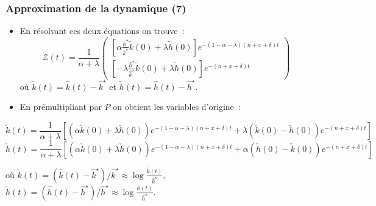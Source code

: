 \documentclass[10pt,notheorems]{beamer}
\theoremstyle{plain}
\theoremstyle{definition} %
\begin{document}
\begin{frame}
  \frametitle{Approximation de la dynamique (7)}

  \begin{itemize}

  \item En résolvant ces deux équations on trouve~:
    \[
      \mathcal Z(t) =
      \frac{1}{\alpha+\lambda}
      \begin{pmatrix}
        \left[\alpha\frac{\hat h^\star}{\hat k^\star}\tilde k(0)+\lambda \tilde h(0)\right]e^{-(1-\alpha-\lambda)(n+x+\delta)t}\\
        \left[-\lambda\frac{\hat h^\star}{\hat k^\star}\tilde k(0)+\lambda \tilde h(0) \right]e^{-(n+x+\delta)t}
      \end{pmatrix}
    \]
    où $\tilde k(t) = \hat k(t)-\hat k^\star$ et $\tilde h(t) = \hat h(t)-\hat h^\star$.\newline

  \item En prémultipliant par $P$ on obtient les variables d'origine~:

  \end{itemize}

  {\small
    \[
      \check{k}(t) = \frac{1}{\alpha+\lambda}\left[\left(\alpha \check{k}(0)+\lambda \check{h}(0)\right)e^{-(1-\alpha-\lambda)(n+x+\delta)t}+\lambda \left(\check{k}(0)-\check{h}(0)\right)e^{-(n+x+\delta)t}\right]
    \]
    \[
      \check{h}(t) = \frac{1}{\alpha+\lambda}\left[\left(\alpha \check{k}(0)+\lambda \check{h}(0)\right)e^{-(1-\alpha-\lambda)(n+x+\delta)t} + \alpha \left(\check{h}(0)-\check{k}(0)\right)e^{-(n+x+\delta)t}\right]
    \]
  }

  \medskip

  où $\check{k}(t) = (\hat k(t)-\hat k^{\star})/\hat k^{\star} \approx \log \frac{\hat k(t)}{\hat k^{\star}}$,
  $\check{h}(t) = (\hat h(t)-\hat h^{\star})/\hat h^{\star} \approx \log \frac{\hat h(t)}{\hat h^{\star}}$.

\end{frame}
\end{document}
